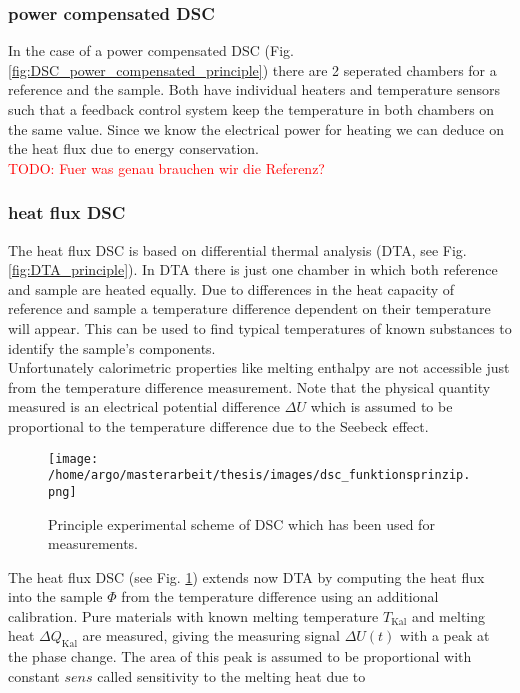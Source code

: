 \documentclass{scrartcl}[12pt, halfparskip]
\newcommand{\todo}[1]{\textcolor{red}{TODO: #1}}
\begin{document}
\subsubsection{power compensated DSC}
In the case of a power compensated DSC (Fig. \ref{fig:DSC_power_compensated_principle}) there are 2 seperated chambers for a reference and the sample. Both have individual heaters and temperature sensors such that a feedback control system keep the temperature in both chambers on the same value. Since we know the electrical power for heating we can deduce on the heat flux due to energy conservation. \\
\todo{Fuer was genau brauchen wir die Referenz?}




\subsubsection{heat flux DSC}
The heat flux DSC is based on differential thermal analysis (DTA, see Fig. \ref{fig:DTA_principle}). 
In DTA there is just one chamber in which both reference and sample are heated equally. 
Due to differences in the heat capacity of reference and sample a temperature difference dependent on their temperature will appear.
This can be used to find typical temperatures of known substances to identify the sample's components. \\
Unfortunately calorimetric properties like melting enthalpy are not accessible just from the temperature difference measurement. 
Note that the physical quantity measured is an electrical potential difference $\Delta U$ which is assumed to be proportional to the temperature difference due to the Seebeck effect. \\

\begin{figure}[H]
	\centering
	\texttt{[image: /home/argo/masterarbeit/thesis/images/dsc\_funktionsprinzip.png]}
	\caption{Principle experimental scheme of DSC which has been used for measurements.}
	\label{fig:heat_flux_DSC}
\end{figure}

The heat flux DSC (see Fig. \ref{fig:heat_flux_DSC}) extends now DTA by computing the heat flux into the sample $\Phi$ from the temperature difference using an additional calibration. 
Pure materials with known melting temperature $T_{\text{Kal}}$ and melting heat $\Delta Q_{\text{Kal}}$ are measured, giving the measuring signal $\Delta U(t)$ with a peak at the phase change. 
The area of this peak is assumed to be proportional with constant $sens$ called sensitivity to the melting heat due to
\end{document}
